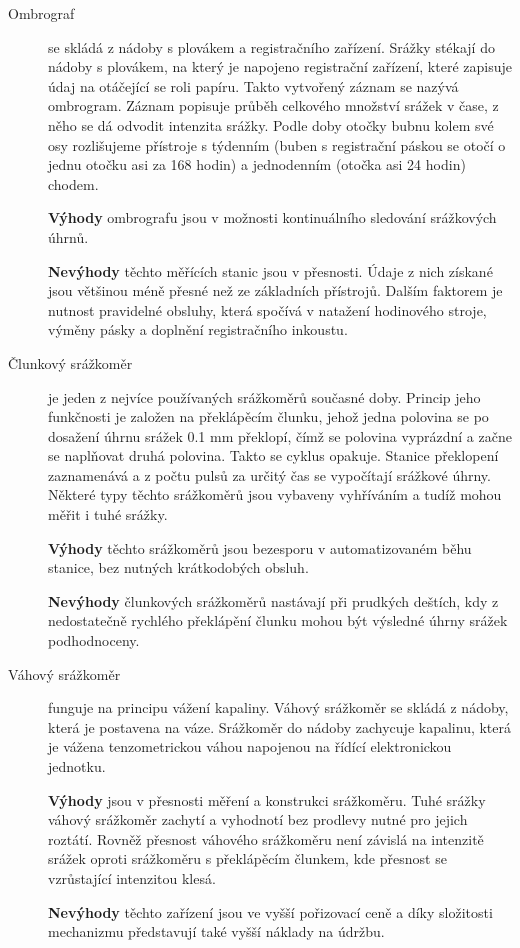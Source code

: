 \documentclass[a4paper,12pt]{article}
\begin{document}
\begin{description} 
\item[Ombrograf]se skládá z nádoby s plovákem a registračního zařízení. Srážky stékají do nádoby s plovákem, na který je napojeno registrační zařízení, které zapisuje údaj na otáčející se roli papíru. Takto vytvořený záznam se nazývá ombrogram. Záznam popisuje průběh celkového množství srážek v čase, z něho se dá odvodit intenzita srážky. Podle doby otočky bubnu kolem své osy rozlišujeme přístroje s týdenním (buben s registrační páskou se otočí o jednu otočku asi za 168 hodin) a jednodenním (otočka asi 24 hodin) chodem.\cite{chmu_navod}

\textbf{Výhody} ombrografu jsou v možnosti kontinuálního sledování srážkových úhrnů.

\textbf{Nevýhody} těchto měřících stanic jsou v přesnosti. Údaje z nich získané jsou většinou méně přesné než ze základních přístrojů. Dalším faktorem je nutnost pravidelné obsluhy, která spočívá v natažení hodinového stroje, výměny pásky a doplnění registračního inkoustu.
\end{description}

\begin{description} 
\item[Člunkový srážkoměr] je jeden z nejvíce používaných srážkoměrů současné doby. Princip jeho funkčnosti je založen na překlápěcím člunku, jehož jedna polovina se po dosažení úhrnu srážek 0.1 mm překlopí, čímž se polovina vyprázdní a začne se naplňovat druhá polovina. Takto se cyklus opakuje. Stanice překlopení zaznamenává a z počtu pulsů za určitý čas se vypočítají srážkové úhrny. Některé typy těchto srážkoměrů jsou vybaveny vyhříváním a tudíž mohou měřit i tuhé srážky.

\textbf{Výhody} těchto srážkoměrů jsou bezesporu v automatizovaném běhu stanice, bez nutných krátkodobých obsluh. 

\textbf{Nevýhody} člunkových srážkoměrů nastávají při prudkých deštích, kdy z nedostatečně rychlého překlápění člunku mohou být výsledné úhrny srážek podhodnoceny.\cite{sevruk}
\end{description}

\begin{description} 
\item[Váhový srážkoměr] funguje na principu vážení kapaliny. Váhový srážkoměr se skládá z nádoby, která je postavena na váze. Srážkoměr do nádoby zachycuje kapalinu, která je vážena tenzometrickou váhou napojenou na řídící elektronickou jednotku.

\textbf{Výhody} jsou v přesnosti měření a konstrukci srážkoměru. Tuhé srážky váhový srážkoměr zachytí a vyhodnotí bez prodlevy nutné pro jejich roztátí. Rovněž přesnost váhového srážkoměru není závislá na intenzitě srážek oproti srážkoměru s překlápěcím člunkem, kde přesnost se vzrůstající intenzitou klesá.

\textbf{Nevýhody} těchto zařízení jsou ve vyšší pořizovací ceně a díky složitosti mechanizmu představují také vyšší náklady na údržbu.
\end{description}
\end{document}
